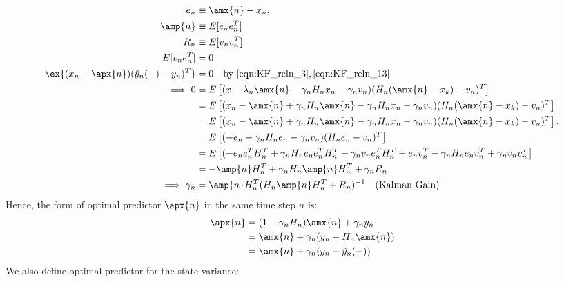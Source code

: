 \begin{align}
e_n & \equiv \amx{n} - x_n,  \\
\amp{n} & \equiv E[e_ne_n^T] \\
R_n & \equiv E[v_nv_n^T]\\
E[v_n e_n^T]&=0  \\
\ex{(x_n - \apx{n})(\hat{y}_n(-) - y_n)^T} &=0 \quad \text{by \ref{eqn:KF_reln_3}}, \ref{eqn:KF_reln_13} \\
\implies 0 &= E\left[(x -\lambda_n \amx{n} - \gamma_n H_n x_n - \gamma_n v_n)(H_n (\amx{n} - x_{k}) -v_n)^T\right] \\
&= E\left[(x_n - \amx{n} + \gamma_n H_n\amx{n} - \gamma_n H_n x_n - \gamma_n v_n)(H_n (\amx{n} - x_{k}) -v_n)^T\right]  \\
&= E\left[(x_n - \amx{n} + \gamma_n H_n\amx{n} - \gamma_n H_n x_n - \gamma_n v_n)(H_n (\amx{n} - x_{k}) -v_n)^T\right].  \\
&= E\left[(-e_n + \gamma_n H_ne_n - \gamma_n v_n)(H_n e_n -v_n)^T\right]  \\
&= E\left[(-e_ne_n^T H_n^T+ \gamma_n H_ne_ne_n^T H_n^T - \gamma_n v_ne_n^T H_n^T + e_nv_n^T - \gamma_n H_ne_nv_n^T + \gamma_n v_nv_n^T \right]  \\
&= -\amp{n} H_n^T+ \gamma_n H_n\amp{n}H_n^T + \gamma_n R_n \\
\implies \gamma_n &= \amp{n} H_n^T(H_n\amp{n}H_n^T + R_n)^{-1} \quad \text{(Kalman Gain)} \label{eqn:KF_update_gamma}
\end{align}
Hence, the form of optimal predictor $\apx{n}$ in the same time step $n$ is:
\begin{align}
\apx{n} &= (1 - \gamma_nH_n) \amx{n} + \gamma_ny_n \\
& =  \amx{n} + \gamma_n(y_n - H_n\amx{n}) \\
&= \amx{n} + \gamma_n (y_n - \hat{y}_n(-)) \label{eqn:KF_update_x+} 
\end{align}
We also define optimal predictor for the state variance:
